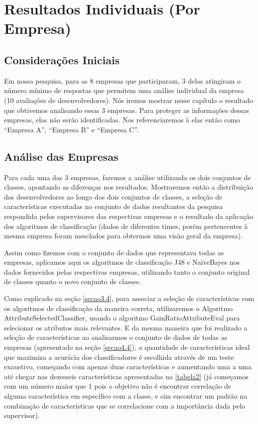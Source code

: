 \chapter[Resultados Individuais]{Resultados Individuais (Por Empresa)}

\section{Considerações Iniciais}

Em nossa pesquisa, para as 8 empresas que participaram, 3 delas atingiram o número mínimo de respostas que permitem uma análise individual da empresa (10 avaliações de desenvolvedores). Nós iremos mostrar nesse capítulo o resultado que obtivemos analisando essas 3 empresas. Para proteger as informações dessas empresas, elas não serão identificadas. Nos referenciaremos à elas então como “Empresa A”, “Empresa B” e “Empresa C”.

\section{Análise das Empresas}

Para cada uma das 3 empresas, faremos a análise utilizando os dois conjuntos de classes, apontando as diferenças nos resultados. Mostraremos então a distribuição dos desenvolvedores ao longo dos dois conjuntos de classes, a seleção de características executadas no conjunto de dados resultantes da pesquisa respondida pelos supervisores das respectivas empresas e o resultado da aplicação dos algoritmos de classificação (dados de diferentes times, porém pertencentes à mesma empresa foram mesclados para obtermos uma visão geral da empresa).

Assim como fizemos com o conjunto de dados que representava todas as empresas, aplicamos aqui os algoritmos de classificação J48 e NaïveBayes nos dados fornecidos pelas respectivas empresas, utilizando tanto o conjunto original de classes quanto o novo conjunto de classes. 

Como explicado na seção \ref{secao3.4}, para associar a seleção de características com os algoritmos de classificação da maneira correta, utilizaremos o Algoritmo AttributeSelectedClassifier, usando o algoritmo GainRatioAttributeEval para selecionar os atributos mais relevantes. E da mesma maneira que foi realizado a seleção de características ao analisarmos o conjunto de dados de todas as empresas (apresentado na seção \ref{secao4.4}), a quantidade de características ideal que maximiza a acurácia dos classificadores é escolhida através de um teste exaustivo, começando com apenas duas características e aumentando uma a uma até chegar nas dezesseis características apresentadas na \autoref{tabela2} (já começamos com um número maior que 1 pois o objetivo não é encontrar correlação de alguma característica em específico com a classe, e sim encontrar um padrão na combinação de características que se correlacione com a importância dada pelo supervisor).

